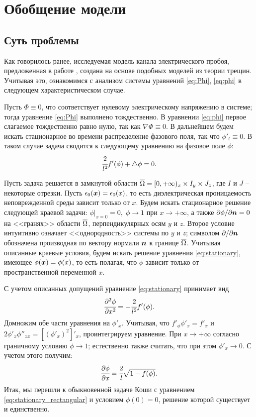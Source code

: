 
\section{Обобщение модели}

\subsection{Суть проблемы}
\label{ssec:matter_of_problem}

Как говорилось ранее, исследуемая модель канала электрического пробоя, предложенная в работе \cite{pitike_dielectric_breakdown}, создана на основе подобных моделей из теории трещин. Учитывая это, ознакомимся с анализом системы уравнений \eqref{eq:Phi}, \eqref{eq:phi} в следующем характеристическом случае.

Пусть $\Phi \equiv 0$, что соответствует нулевому электрическому напряжению в системе; тогда уравнение \eqref{eq:Phi} выполнено тождественно. В уравнении \eqref{eq:phi} первое слагаемое тождественно равно нулю, так как $\nabla \Phi \equiv 0$. В дальнейшем будем искать стационарное во времени распределение фазового поля, так что $\phi'_t \equiv 0$. В таком случае задача сводится к следующему уравнению на фазовое поле $\phi$:
\begin{equation}
    \cfrac{2}{l^2} f'(\phi) + \triangle \phi = 0 {\text{.}}
    \label{eq:stationary}
\end{equation}

Пусть задача решается в замкнутой области ${\overline{\Omega}} = [0, +\infty)_x \times I_y \times J_z$, где $I$ и $J$ -- некоторые отрезки. Пусть $\epsilon_0({\boldsymbol{x}}) = \epsilon_0(x)$, то есть диэлектрическая проницаемость неповрежденной среды зависит только от $x$. Будем искать стационарное решение следующей краевой задачи: $\phi|_{x = 0} = 0, \; \phi \to 1$ при $x \to +\infty$, а также $\partial \phi / \partial {\boldsymbol{n}} = 0$ на <<гранях>> области ${\overline{\Omega}}$, перпендикулярных осям $y$ и $z$. Второе условие интуитивно означает <<однородность>> системы по $y$ и $z$; символом $\partial  / \partial {\boldsymbol{n}}$ обозначена производная по вектору нормали ${\boldsymbol{n}}$ к границе ${\overline{\Omega}}$. Учитывая описанные краевые условия, будем искать решение уравнения \eqref{eq:stationary}, имеющее $\phi({\boldsymbol{x}}) = \phi(x)$, то есть полагая, что $\phi$ зависит только от пространственной переменной $x$.

С учетом описанных допущений уравнение \eqref{eq:stationary} принимает вид
$$\cfrac{\partial^2 \phi}{\partial x^2} = -\cfrac{2}{l^2} f'(\phi) {\text{.}}$$
Домножим обе части уравнения на $\phi'_x$. Учитывая, что $f'_\phi \phi'_x = f'_x$ и $2 \phi'_x \phi''_{xx} = [(\phi'_x)^2]'_x$, проинтегрируем уравнение. При $x \to +\infty$ согласно граничному условию $\phi \to 1$; естественно также считать, что при этом $\phi'_x \to 0$. С учетом этого получим:
\begin{equation}
    \cfrac{\partial \phi}{\partial x} = \cfrac{2}{l} \sqrt{1 - f(\phi)} {\text{.}}
    \label{eq:stationary_rectangular}
\end{equation}
Итак, мы перешли к обыкновенной задаче Коши с уравнением \eqref{eq:stationary_rectangular} и условием $\phi(0) = 0$, решение которой существует и единственно.

